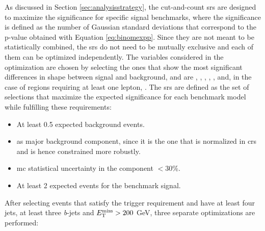 As discussed in Section \ref{sec:analysisstrategy}, the cut-and-count \glspl{sr} are designed to maximize the significance for specific 
signal benchmarks, where the significance is defined as the number of Gaussian standard deviations that correspond to the p-value obtained with Equation \ref{eq:binomexpp}.
Since they are not meant to be statistically combined, the \glspl{sr} do not need to be mutually exclusive and each of them can be optimized independently.
The variables considered in the optimization are chosen by selecting the ones that show the most significant differences in shape between signal and background, and are \njet, \nbjet, \met, \meff, \mjsum, \mtb and, in the case of regions requiring at least one lepton, \mt.
The \glspl{sr} are defined as the set of selections that maximize the expected significance for each benchmark model while fulfilling these requirements:
\begin{itemize}
\item At least 0.5 expected background events.
\item \ttbar as major background component, since it is the one that is normalized in \glspl{cr}  and is hence constrained more robustly. 
\item \Gls{mc} statistical uncertainty in the \ttbar component $<30$\%.
\item At least 2 expected events for the benchmark signal. 
\end{itemize}
After selecting events that satisfy the \met trigger requirement and have at least four jets, at least three \textit{b}-jets and $E_{\rm T}^{\mathrm{miss}}>200$ GeV, 
three separate optimizations are performed:

